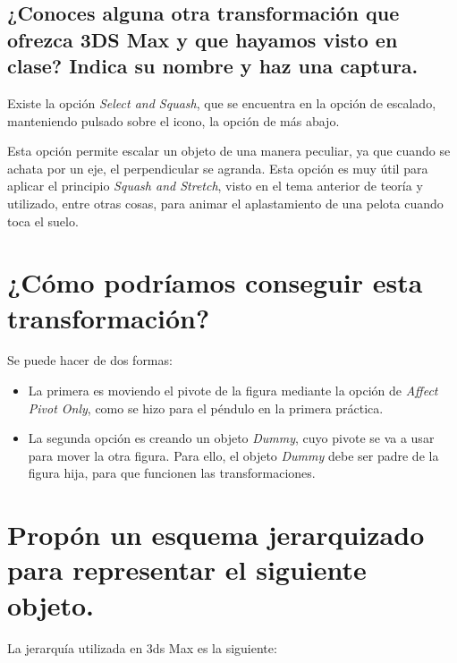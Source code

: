 \documentclass{article}
\begin{document}
\subsection{¿Conoces alguna otra transformación que ofrezca 3DS Max y que hayamos visto en clase? Indica su nombre y haz una captura.}

Existe la opción \textit{Select and Squash}, que se encuentra en la opción de escalado, manteniendo pulsado sobre el icono, la opción de más abajo.


Esta opción permite escalar un objeto de una manera peculiar, ya que cuando se achata por un eje, el perpendicular se agranda. Esta opción es muy útil para aplicar el principio \textit{Squash and Stretch}, visto en el tema anterior de teoría y utilizado, entre otras cosas, para animar el aplastamiento de una pelota cuando toca el suelo.


\section{¿Cómo podríamos conseguir esta transformación?}


Se puede hacer de dos formas:

\begin{itemize}
    \item La primera es moviendo el pivote de la figura mediante la opción de \textit{Affect Pivot Only}, como se hizo para el péndulo en la primera práctica.
    
    
    \item La segunda opción es creando un objeto \textit{Dummy}, cuyo pivote se va a usar para mover la otra figura. Para ello, el objeto \textit{Dummy} debe ser padre de la figura hija, para que funcionen las transformaciones.
\end{itemize}

\section{Propón un esquema jerarquizado para representar el siguiente objeto.}


La jerarquía utilizada en 3ds Max es la siguiente:

\end{document}
